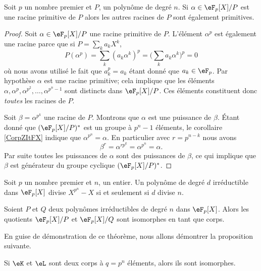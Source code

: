 \begin{lemma}       \label{Lembcerei}
    Soit \( p\) un nombre premier et \( P\), un polynôme de degré \( n\). Si \( \alpha\in \eF_p[X]/P\) est une racine primitive de \( P\) alors les autres racines de \(P\) sont également primitives.
\end{lemma}

\begin{proof}
    Soit \( \alpha\in \eF_p[X]/P\) une racine primitive de \( P\). L'élément \( \alpha^p\) est également une racine parce que si \( P=\sum_ka_kX^k\),
    \begin{equation}
        P(\alpha^p)=\sum_k(a_k\alpha^k)^p=\big( \sum_ka_k\alpha^k \big)^p=0
    \end{equation}
    où nous avons utilisé le fait que \( a_k^p=a_k\) étant donné que \( a_k\in\eF_p\). Par hypothèse \( \alpha\) est une racine primitive; cela implique que les éléments \( \alpha,\alpha^p,\alpha^{p^2},\ldots,\alpha^{p^n-1}\) sont distincts dans \( \eF_p[X]/P\). Ces éléments constituent donc \emph{toutes} les racines de \( P\).

    Soit \( \beta=\alpha^{p^k}\) une racine de \( P\). Montrons que \( \alpha\) est une puissance de \( \beta\). Étant donné que \( (\eF_p[X]/P)^*\) est un groupe à \( p^n-1\) éléments, le corollaire \ref{CorpZItFX} indique que \( \alpha^{p^n}=\alpha\). En particulier avec \( r=p^{n-k}\) nous avons
    \begin{equation}
        \beta^r=\alpha^{rp^k}=\alpha^{p^n}=\alpha.
    \end{equation}
    Par suite toutes les puissances de \( \alpha\) sont des puissances de \( \beta\), ce qui implique que \( \beta\) est générateur du groupe cyclique \( (\eF_p[X]/P)^*\).
\end{proof}

\begin{lemma}       \label{LemkzWjse}
    Soit \( p\) un nombre premier et \( n\), un entier. Un polynôme de degré \( d\) irréductible dans \( \eF_p[X]\) divise \( X^{p^n}-X\) si et seulement si \( d\) divise \( n\).
\end{lemma}

\begin{theorem}
    Soient \( P\) et \( Q\) deux polynômes irréductibles de degré \( n\) dans \( \eF_p[X]\). Alors les quotients \( \eF_p[X]/P\) et \( \eF_p[X]/Q\) sont isomorphes en tant que corps.
\end{theorem}
En guise de démonstration de ce théorème, nous allons démontrer la proposition suivante.
\begin{proposition}
    Si \( \eK\) et \( \eL\) sont deux corps à \( q=p^n\) éléments, alors ils sont isomorphes.
\end{proposition}

